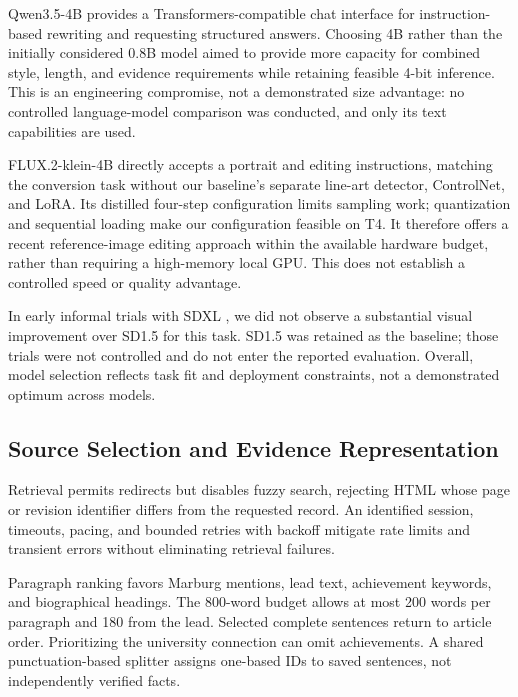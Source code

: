 \documentclass[11pt]{article}
\begin{document}
Qwen3.5-4B \citep{qwen35-4b-model-card} provides a Transformers-compatible chat interface for instruction-based rewriting and requesting structured answers. Choosing 4B rather than the initially considered 0.8B model aimed to provide more capacity for combined style, length, and evidence requirements while retaining feasible 4-bit inference. This is an engineering compromise, not a demonstrated size advantage: no controlled language-model comparison was conducted, and only its text capabilities are used.

FLUX.2-klein-4B \citep{flux2-klein-4b-model-card} directly accepts a portrait and editing instructions, matching the conversion task without our baseline's separate line-art detector, ControlNet, and LoRA. Its distilled four-step configuration limits sampling work; quantization and sequential loading make our configuration feasible on T4. It therefore offers a recent reference-image editing approach within the available hardware budget, rather than requiring a high-memory local GPU. This does not establish a controlled speed or quality advantage.

In early informal trials with SDXL \citep{podell-etal-2023-sdxl}, we did not observe a substantial visual improvement over SD1.5 for this task. SD1.5 was retained as the baseline; those trials were not controlled and do not enter the reported evaluation. Overall, model selection reflects task fit and deployment constraints, not a demonstrated optimum across models.

\subsection{Source Selection and Evidence Representation}

Retrieval permits redirects but disables fuzzy search, rejecting HTML whose page or revision identifier differs from the requested record. An identified session, timeouts, pacing, and bounded retries with backoff mitigate rate limits and transient errors without eliminating retrieval failures.

Paragraph ranking favors Marburg mentions, lead text, achievement keywords, and biographical headings. The 800-word budget allows at most 200 words per paragraph and 180 from the lead. Selected complete sentences return to article order. Prioritizing the university connection can omit achievements. A shared punctuation-based splitter assigns one-based IDs to saved sentences, not independently verified facts.
\end{document}
